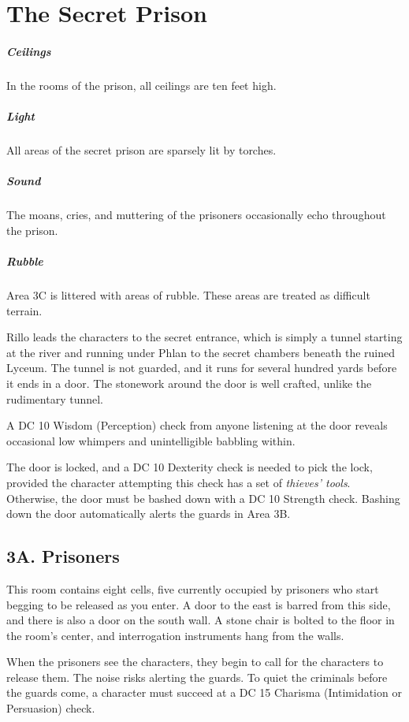 \documentclass[10pt,a4paper,twoside,bg=print,twocolumn,openany,nodeprecatedcode]{dndbook}
\begin{document}
\section{The Secret Prison}
\subparagraph{Ceilings}
In the rooms of the prison, all ceilings are ten feet high.

\subparagraph{Light}
All areas of the secret prison are sparsely lit by torches.

\subparagraph{Sound}
The moans, cries, and muttering of the prisoners occasionally echo throughout the prison.

\subparagraph{Rubble}
Area 3C is littered with areas of rubble. These areas are treated as difficult terrain.

Rillo leads the characters to the secret entrance, which is simply a tunnel starting at the river and running under Phlan to the secret chambers beneath the ruined Lyceum. The tunnel is not guarded, and it runs for several hundred yards before it ends in a door. The stonework around the door is well crafted, unlike the rudimentary tunnel.

A DC 10 Wisdom (Perception) check from anyone listening at the door reveals occasional low whimpers and unintelligible babbling within.

The door is locked, and a DC 10 Dexterity check is needed to pick the lock, provided the character attempting this check has a set of \textit{thieves' tools}. Otherwise, the door must be bashed down with a DC 10 Strength check. Bashing down the door automatically alerts the guards in Area 3B.

\subsection{3A. Prisoners}
\begin{DndReadAloud}{}
This room contains eight cells, five currently occupied by prisoners who start begging to be released as you enter. A door to the east is barred from this side, and there is also a door on the south wall. A stone chair is bolted to the floor in the room's center, and interrogation instruments hang from the walls.

\end{DndReadAloud}

When the prisoners see the characters, they begin to call for the characters to release them. The noise risks alerting the guards. To quiet the criminals before the guards come, a character must succeed at a DC 15 Charisma (Intimidation or Persuasion) check.
\end{document}
